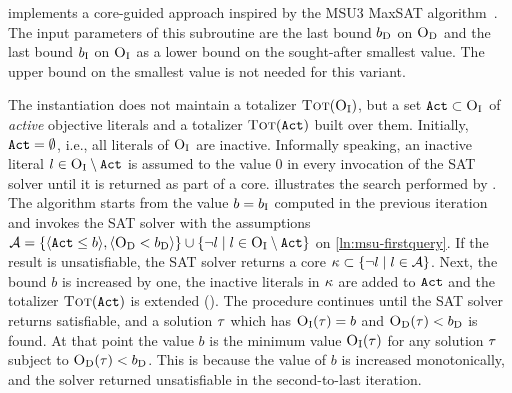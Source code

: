 \msu{} implements a core-guided approach inspired by the MSU3 MaxSAT algorithm~\autocites{DBLP:journals/corr/abs-0712-1097}.
The input parameters of this subroutine are the last bound $b_{\text{D}}$ on $\textsc{O}_{\text{D}}$ and the last bound $b_{\text{I}}$ on $\textsc{O}_{\text{I}}$ as a lower bound on the sought-after smallest value.
The upper bound on the smallest value is not needed for this variant.

The \msu{} instantiation does not maintain a totalizer $\textsc{Tot}(\textsc{O}_{\text{I}})$, but a set $\texttt{Act} \subset \textsc{O}_{\text{I}}$ of \emph{active} objective literals and a totalizer $\textsc{Tot}(\texttt{Act})$ built over them. 
Initially, $\texttt{Act} = \emptyset$, i.e., all literals of $\textsc{O}_{\text{I}}$ are inactive.
Informally speaking, an inactive literal $l \in \textsc{O}_{\text{I}} \setminus \texttt{Act}$ is assumed to the value $0$ in every invocation of the SAT solver until it is returned as part of a core.
 illustrates the search performed by \msu{}.
The algorithm starts from the value $b=b_{\text{I}}$ computed in the previous iteration and invokes the SAT solver with the assumptions $\mathcal{A} = \{\langle \texttt{Act} \leq b \rangle, \langle \textsc{O}_{\text{D}} < b_{\text{D}} \rangle  \} \cup \{ \lnot l \mid l \in \textsc{O}_{\text{I}} \setminus \texttt{Act}\}$ on \cref{ln:msu-firstquery}.
If the result is unsatisfiable, the SAT solver returns a core $\kappa \subset \{\lnot l \mid l \in \mathcal{A}\}$.
Next, the bound $b$ is increased by one, the inactive literals in $\kappa$ are added to $\texttt{Act}$ and the totalizer $\textsc{Tot}(\texttt{Act})$ is extended ().
The procedure continues until the SAT solver returns satisfiable, and a solution $\tau$ which has $\textsc{O}_{\text{I}}(\tau) = b$ and $\textsc{O}_{\text{D}}(\tau) < b_{\text{D}}$ is found.
At that point the value $b$ is the minimum value $\textsc{O}_{\text{I}}(\tau)$ for any solution $\tau$ subject to $\textsc{O}_{\text{D}}(\tau) < b_{\text{D}}$.
This is because the value of $b$ is increased monotonically, and the solver returned unsatisfiable in the second-to-last iteration. 

